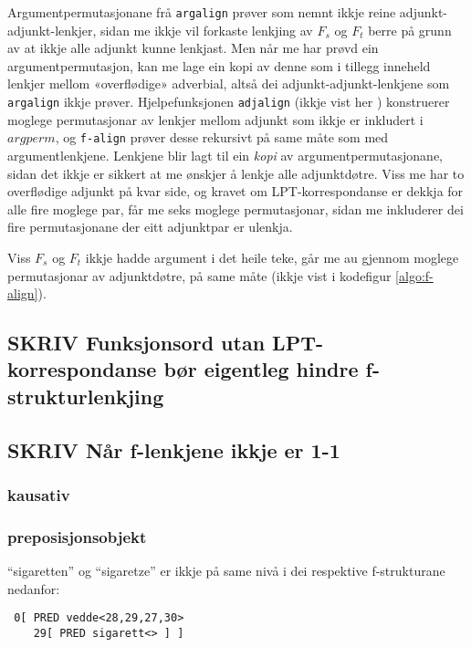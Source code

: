 \documentclass[11pt,a4paper,oneside,draft]{book}
\begin{document}
Argumentpermutasjonane frå \texttt{argalign} prøver som nemnt ikkje reine
adjunkt-adjunkt-lenkjer, sidan me ikkje vil forkaste lenkjing av $F_s$
og $F_t$ berre på grunn av at ikkje alle adjunkt kunne lenkjast. Men
når me har prøvd ein argumentpermutasjon, kan me lage ein kopi av
denne som i tillegg inneheld lenkjer mellom «overflødige» adverbial,
altså dei adjunkt-adjunkt-lenkjene som \texttt{argalign} ikkje
prøver. Hjelpefunksjonen \texttt{adjalign} (ikkje vist her
) konstruerer moglege
permutasjonar av lenkjer mellom adjunkt som ikkje er inkludert i
$argperm$, og \texttt{f-align} prøver desse rekursivt på same måte som med
argumentlenkjene.  Lenkjene blir lagt til ein
\emph{kopi} av argumentpermutasjonane, sidan det ikkje er sikkert at me
ønskjer å lenkje alle adjunktdøtre. Viss me har to overflødige adjunkt
på kvar side, og kravet om LPT-korrespondanse er dekkja for alle fire
moglege par, får me seks moglege permutasjonar, sidan me inkluderer
dei fire permutasjonane der eitt adjunktpar er ulenkja.

Viss $F_s$ og $F_t$ ikkje hadde argument i det heile teke, går me au
gjennom moglege permutasjonar av adjunktdøtre, på same måte (ikkje
vist i kodefigur \ref{algo:f-align}).

\subsection{\textbf{SKRIV} Funksjonsord utan LPT-korrespondanse bør eigentleg hindre f-strukturlenkjing}
\label{sec-4.1.2}

\subsection{\textbf{SKRIV} Når f-lenkjene ikkje er 1-1}
\label{sec-4.1.3}

\subsubsection{kausativ}
\label{sec-4.1.3.1}

\subsubsection{preposisjonsobjekt}
\label{sec-4.1.3.2}

``sigaretten'' og ``sigaretze'' er ikkje på same nivå i dei respektive
f-strukturane nedanfor:
\begin{verbatim}
 0[ PRED vedde<28,29,27,30>
    29[ PRED sigarett<> ] ]
\end{verbatim}
\end{document}

